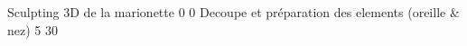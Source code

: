 
%
%
%                                                            
%                                                            
%
%
% 
%
\def\Objet                  {devis}               %
\def\AfficherTVA            {non}                   %
\def\FactureAcquittee	    {oui}		            %
\def\FactureLieu	        {Tours}                 %
\def\black	        {non}                 %
%
%
\def\FactureObjet	        {Facture}               %
\def\FactureNum	            {061901}	            %
\def\FactureDescr           {                       %
Réalisation du prototype et de la version final %
d'une marionette pour la ventriloquie.%
}
%
%
\def\ClientNom              {Christian GABRIEL}        %
\def\ClientAdresseRue       {24 avenue de Grammont} %
\def\ClientAdresseVille     {Tours}                 %
\def\ClientAdresseCodePostal{37000}                 %
\def\ClientAdressePays      {France}                %
%   
%
%
%
%
%
 {Sculpting 3D de la marionette} {0} {0}
 {Decoupe et préparation des elements (oreille \& nez)} {5} {30}
